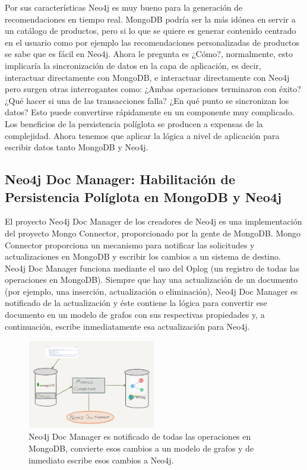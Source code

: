 \documentclass[conference]{IEEEtran}
\begin{document}
Por sus caracter\'isticas Neo4j es muy bueno para la generaci\'on de recomendaciones en tiempo real. MongoDB podr\'ia ser la m\'as id\'onea en servir a un cat\'alogo de productos, pero si lo que se quiere es generar contenido centrado en el usuario como por ejemplo las recomendaciones personalizadas de productos se sabe que es f\'acil en Neo4j. Ahora le pregunta es ¿C\'omo?, normalmente, esto implicar\'ia la sincronizaci\'on de datos en la capa de aplicaci\'on, es decir, interactuar directamente con  MongoDB, e interactuar directamente con Neo4j pero surgen otras interrogantes como: ¿Ambas operaciones terminaron con \'exito? ¿Qu\'e hacer si una de las transacciones falla? ¿En qu\'e punto se sincronizan los datos? Esto puede convertirse r\'apidamente en un componente muy complicado. Los beneficios de la persistencia pol\'iglota se producen a expensas de la complejidad. Ahora tenemos que aplicar la l\'ogica a nivel de aplicaci\'on para escribir datos tanto MongoDB y Neo4j.

\subsection*{Neo4j Doc Manager: Habilitaci\'on de Persistencia Pol\'iglota en MongoDB y Neo4j}

El proyecto Neo4j Doc Manager de los creadores de Neo4j es una implementaci\'on del proyecto Mongo Connector, proporcionado por la gente de MongoDB. Mongo Connector proporciona un mecanismo para notificar las solicitudes y actualizaciones en MongoDB y escribir los cambios a un sistema de destino. Neo4j Doc Manager funciona mediante el uso del Oplog (un registro de todas las operaciones en MongoDB). Siempre que hay una actualizaci\'on de un documento (por ejemplo, una inserci\'on, actualizaci\'on o eliminaci\'on), Neo4j Doc Manager es notificado de la actualizaci\'on y \'este contiene la l\'ogica para convertir ese documento en un modelo de grafos con sus respectivas propiedades y, a continuaci\'on, escribe inmediatamente esa actualizaci\'on para Neo4j.

\begin{figure}[!h]
\centering
\includegraphics[width=0.5\textwidth]{8}
\caption{Neo4j Doc Manager es notificado de todas las operaciones en MongoDB, convierte esos cambios a un modelo de grafos  y de inmediato escribe esos cambios a Neo4j.}
\label{fig8}
\end{figure}
\end{document}
